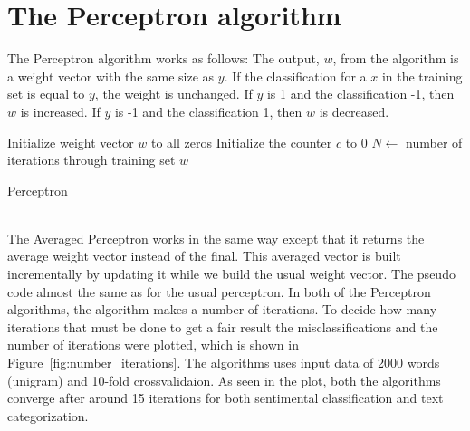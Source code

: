 \section{The Perceptron algorithm}
The Perceptron algorithm works as follows:
The output, $w$, from the algorithm is a weight vector with the same size as $y$. If the classification for a $x$ in the training set is equal to $y$, the weight is unchanged.
If $y$ is 1 and the classification -1, then $w$ is increased. If $y$ is -1 and the classification 1, then $w$ is decreased. \citep{perceptron_ai}
\begin{algorithm}[h!]
\label{algorithm:perceptron}
 \SetAlgoLined
 Initialize weight vector $w$ to all zeros\;
 Initialize the counter $c$ to 0\;
 $N \leftarrow$ number of iterations through training set\;
 \Return $w$
 \caption{Perceptron}
\end{algorithm} \\
The Averaged Perceptron works in the same way except that it returns the average weight vector instead of the final.
This averaged vector is built incrementally by updating it while we build the usual weight vector. The pseudo code almost the same as for the usual perceptron.
In both of the Perceptron algorithms, the algorithm makes a number of iterations. To decide how many iterations that must be done to get a fair result the misclassifications and the number of iterations were plotted, which is shown in Figure~\ref{fig:number_iterations}. The algorithms uses input data of 2000 words (unigram) and 10-fold crossvalidaion. As seen in the plot, both the algorithms converge after around 15 iterations for both sentimental classification and text categorization.
